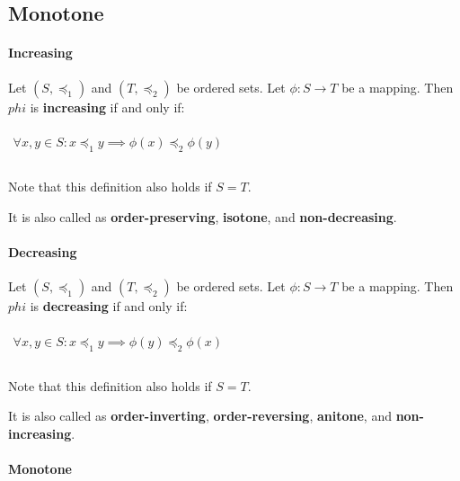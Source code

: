 \subsection{Monotone}

\paragraph{Increasing}
\label{sec:increasing}

Let $(S, \preceq_1)$ and $(T, \preceq_2)$ be ordered sets. Let
$\phi: S \to T$ be a mapping. Then $phi$ is \textbf{increasing} if and
only if:

\begin{math}
  \begin{array}{c}
    \\
    \forall x, y \in S: x \preceq_1 y \implies \phi(x) \preceq_2 \phi(y) \\
    \\
  \end{array}
\end{math}

Note that this definition also holds if $S = T$.

It is also called as \textbf{order-preserving}, \textbf{isotone}, and
\textbf{non-decreasing}.

\paragraph{Decreasing}
\label{sec:decreasing}

Let $(S, \preceq_1)$ and $(T, \preceq_2)$ be ordered sets. Let
$\phi: S \to T$ be a mapping. Then $phi$ is \textbf{decreasing} if and
only if:

\begin{math}
  \begin{array}{c}
    \\
    \forall x, y \in S: x \preceq_1 y \implies \phi(y) \preceq_2 \phi(x) \\
    \\
  \end{array}
\end{math}

Note that this definition also holds if $S = T$.

It is also called as \textbf{order-inverting},
\textbf{order-reversing}, \textbf{anitone}, and
\textbf{non-increasing}.


\paragraph{Monotone}
\label{sec:monotone}



